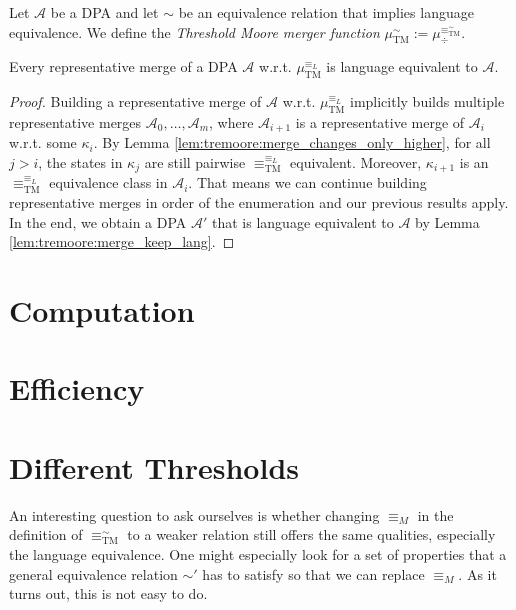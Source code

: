 \vspace{10pt}

\begin{defn}
	Let $\mathcal{A}$ be a DPA and let $\sim$ be an equivalence relation that implies language equivalence. We define the \emph{Threshold Moore merger function} $\mu_\text{TM}^\sim := \mu_\div^{\equiv^\sim_\text{TM}}$.
\end{defn}

\begin{theorem}
	Every representative merge of a DPA $\mathcal{A}$ w.r.t. $\mu_\text{TM}^{\equiv_L}$ is language equivalent to $\mathcal{A}$.
\end{theorem}

\begin{proof}
	Building a representative merge of $\mathcal{A}$ w.r.t. $\mu_\text{TM}^{\equiv_L}$ implicitly builds multiple representative merges $\mathcal{A}_0, \dots, \mathcal{A}_m$, where $\mathcal{A}_{i+1}$ is a representative merge of $\mathcal{A}_i$ w.r.t. some $\kappa_i$. By Lemma \ref{lem:tremoore:merge_changes_only_higher}, for all $j > i$, the states in $\kappa_j$ are still pairwise $\equiv^{\equiv_L}_\text{TM}$ equivalent. Moreover, $\kappa_{i+1}$ is an $\equiv^{\equiv_L}_\text{TM}$ equivalence class in $\mathcal{A}_i$. That means we can continue building representative merges in order of the enumeration and our previous results apply. In the end, we obtain a DPA $\mathcal{A}'$ that is language equivalent to $\mathcal{A}$ by Lemma \ref{lem:tremoore:merge_keep_lang}.
\end{proof}

\section{Computation}


\section{Efficiency}

\section{Different Thresholds}

An interesting question to ask ourselves is whether changing $\equiv_M$ in the definition of $\equiv_\text{TM}^\sim$ to a weaker relation still offers the same qualities, especially the language equivalence. One might especially look for a set of properties that a general equivalence relation $\sim'$ has to satisfy so that we can replace $\equiv_M$. As it turns out, this is not easy to do.

